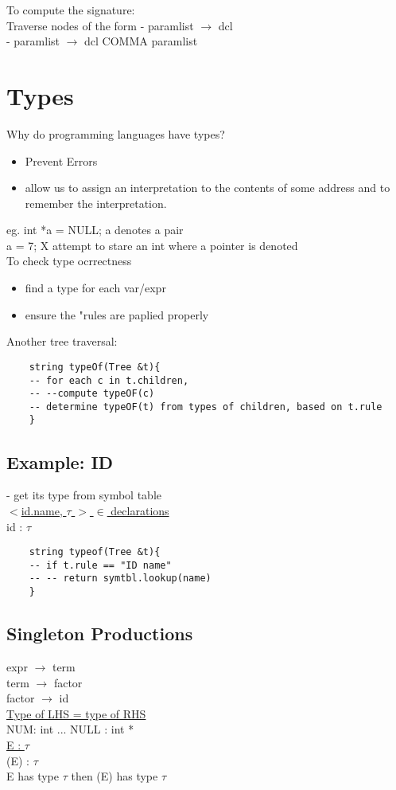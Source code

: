 \documentclass[12pt]{article}
\begin{document}
	To compute the signature:\\
	Traverse nodes of the form 
	- paramlist $\rightarrow$ dcl\\
	- paramlist $\rightarrow$ dcl COMMA paramlist\\
	
	\section*{Types}
	Why do programming languages have types?\\
	\begin{itemize}
		\item Prevent Errors
		\item allow us to assign an interpretation to the contents of some address and to remember the interpretation.\\
	\end{itemize}
	
	eg. int *a = NULL; a denotes a pair\\
	a = 7; X attempt to stare an int where a pointer is denoted\\
	
	To check type ocrrectness\\
	\begin{itemize}
		\item find a type for each var/expr
		\item ensure the "rules are paplied properly
	\end{itemize}
	
	Another tree traversal:\\
	\begin{verbatim}
	string typeOf(Tree &t){
	-- for each c in t.children, 
	-- --compute typeOF(c)
	-- determine typeOF(t) from types of children, based on t.rule
	}
	\end{verbatim}
	
	\subsection {Example: ID}
	- get its type from symbol table\\
	
	\underline{$<$id.name, $\tau$ $>$ $\in$ declarations}\\
	id : $\tau$\\
	
	\begin{verbatim}
	string typeof(Tree &t){
	-- if t.rule == "ID name"
	-- -- return symtbl.lookup(name)
	}
	\end{verbatim}
	
	\subsection*{Singleton Productions}
	expr $\rightarrow$ term\\
	term $\rightarrow$ factor\\
	factor $\rightarrow$ id\\
	
	\underline{Type of LHS = type of RHS}\\
	NUM: int ... NULL : int *\\
	
	\underline{E : $\tau$}\\
	(E) : $\tau$\\
	
	E has type $\tau$ then (E) has type $\tau$\\
	
	
	
	
\end{document}
